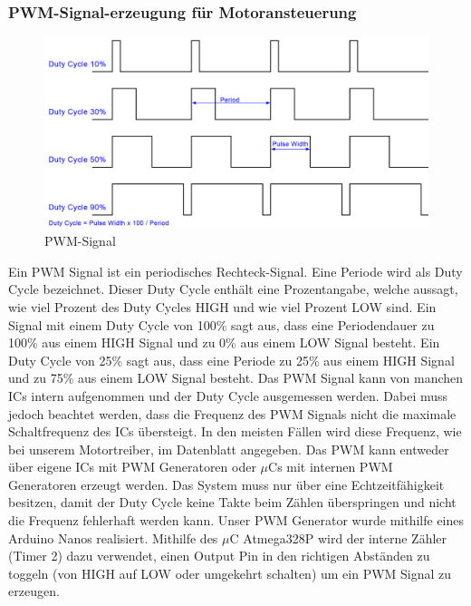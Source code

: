 \subsubsection{PWM-Signal-erzeugung für Motoransteuerung}
\begin{figure}[H] 
\begin{center}

\includegraphics[width=12cm]{Bilder/PWM/Duty_Cycle}
\caption{PWM-Signal}
\label{PWM_Signal}

\end{center}
\end{figure}
Ein PWM Signal ist ein periodisches Rechteck-Signal. Eine Periode wird als Duty Cycle bezeichnet. Dieser Duty Cycle enthält eine Prozentangabe, welche aussagt, wie viel Prozent des Duty Cycles HIGH und wie viel Prozent LOW sind. Ein Signal mit einem Duty Cycle von 100\% sagt aus, dass eine Periodendauer zu 100\% aus einem HIGH Signal und zu 0\% aus einem LOW Signal besteht. Ein Duty Cycle von 25\% sagt aus, dass eine Periode zu 25\% aus einem HIGH Signal und zu 75\% aus einem LOW Signal besteht. Das PWM Signal kann von manchen ICs intern aufgenommen und der Duty Cycle ausgemessen werden. Dabei muss jedoch beachtet werden, dass die Frequenz des PWM Signals nicht die maximale Schaltfrequenz des ICs übersteigt. In den meisten Fällen wird diese Frequenz, wie bei unserem Motortreiber, im Datenblatt angegeben. Das PWM kann entweder über eigene ICs mit PWM Generatoren oder $\mu$Cs mit internen PWM Generatoren erzeugt werden. Das System muss nur über eine Echtzeitfähigkeit besitzen, damit der Duty Cycle keine Takte beim Zählen überspringen und nicht die Frequenz fehlerhaft werden kann. 
Unser PWM Generator wurde mithilfe eines Arduino Nanos realisiert. Mithilfe des $\mu$C Atmega328P wird der interne Zähler (Timer 2) dazu verwendet, einen Output Pin in den richtigen Abständen zu toggeln (von HIGH auf LOW oder umgekehrt schalten) um ein PWM Signal zu erzeugen.


